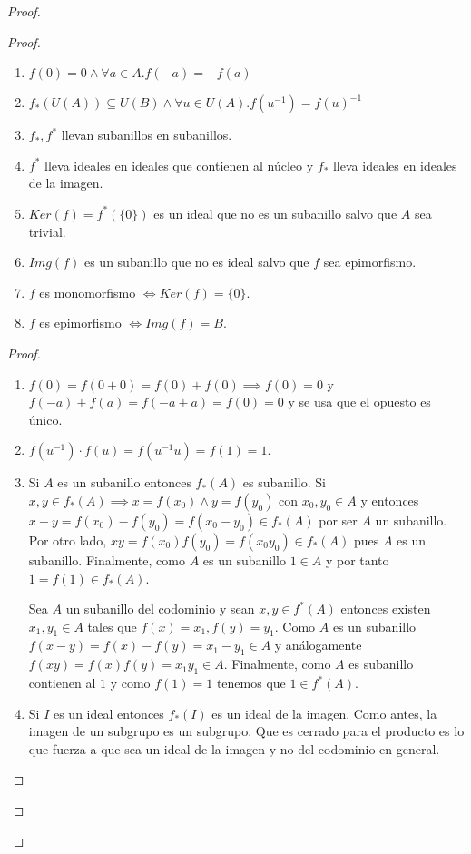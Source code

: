 \begin{proof}
\begin{proof}
\begin{proposition}
	\begin{enumerate}
		\item $f(0) = 0 \land \forall a \in A. f(-a) = -f(a)$
		\item $f_*(U(A)) \subseteq U(B) \land \forall u \in U(A).f(u^{-1}) = f(u)^{-1}$
		\item $f_*,f^*$ llevan subanillos en subanillos. 
		\item $f^*$ lleva ideales en ideales que contienen al núcleo y $f_*$ lleva ideales en ideales de la imagen. 
		\item $Ker(f) = f^*(\{0\})$ es un ideal que no es un subanillo salvo que $A$ sea trivial. 
		\item $Img(f)$ es un subanillo que no es ideal salvo que $f$ sea epimorfismo. 
		\item $f$ es monomorfismo $\iff Ker(f) = \{0\}$.
		\item $f$ es epimorfismo $\iff Img(f) = B$.
	\end{enumerate}
\end{proposition}
\begin{proof}
	\begin{enumerate}
	\item $f(0) = f(0+0) = f(0) + f(0) \implies f(0) = 0$ y $f(-a) + f(a) = f(-a+a) = f(0) = 0$ y se usa que el opuesto es único. 
	\item $f(u^{-1}) \cdot f(u) = f(u^{-1}u) = f(1) = 1$. 
	\item Si $A$ es un subanillo entonces $f_*(A)$ es subanillo. Si $x,y \in f_*(A) \implies x = f(x_0) \land y = f(y_0)$ con $x_0,y_0 \in A$ y entonces $x-y = f(x_0) - f(y_0) = f(x_0-y_0) \in f_*(A)$ por ser $A$ un subanillo. Por otro lado, $xy = f(x_0)f(y_0) = f(x_0y_0) \in f_*(A)$ pues $A$ es un subanillo. Finalmente, como $A$ es un subanillo $1 \in A$ y por tanto $1 = f(1) \in f_*(A)$. 
	
	Sea $A$ un subanillo del codominio y sean $x,y \in f^*(A)$ entonces existen $x_1,y_1 \in A$ tales que $f(x) = x_1,f(y) = y_1$. Como $A$ es un subanillo $f(x-y) = f(x) - f(y) = x_1 - y_1 \in A$ y análogamente $f(xy) = f(x)f(y) = x_1y_1 \in A$. Finalmente, como $A$ es subanillo contienen al $1$ y como $f(1) = 1$ tenemos que $1 \in f^*(A)$. 
	
	\item Si $I$ es un ideal entonces $f_*(I)$ es un ideal de la imagen. Como antes, la imagen de un subgrupo es un subgrupo. Que es cerrado para el producto es lo que fuerza a que sea un ideal de la imagen y no del codominio en general. 
	

\end{enumerate}
\end{proof}
\end{proof}
\end{proof}
